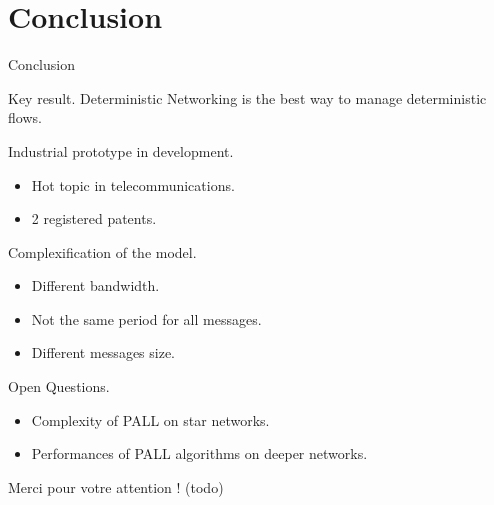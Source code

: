 \documentclass[10 pt]{beamer}
\begin{document}
\section{Conclusion}
\begin{frame}{Conclusion}


\begin{block}{Key result.}
  Deterministic Networking is the best way to manage deterministic flows.
\end{block}

\begin{block}{Industrial prototype in development.}
\begin{itemize}
    \item Hot topic in telecommunications.
    \item 2 registered patents.
      \end{itemize}
\end{block}
  
\begin{block}{Complexification of the model.}
  \begin{itemize}
      \item Different bandwidth.
      \item Not the same period for all messages.
      \item Different messages size.
    \end{itemize}
\end{block}

\begin{block}{Open Questions.}
  \begin{itemize}
      \item Complexity of PALL on star networks.
      \item Performances of PALL algorithms on deeper networks.
    \end{itemize}
\end{block}


\end{frame}

\begin{frame}
Merci pour votre attention ! (todo)
\end{frame}
\end{document}
